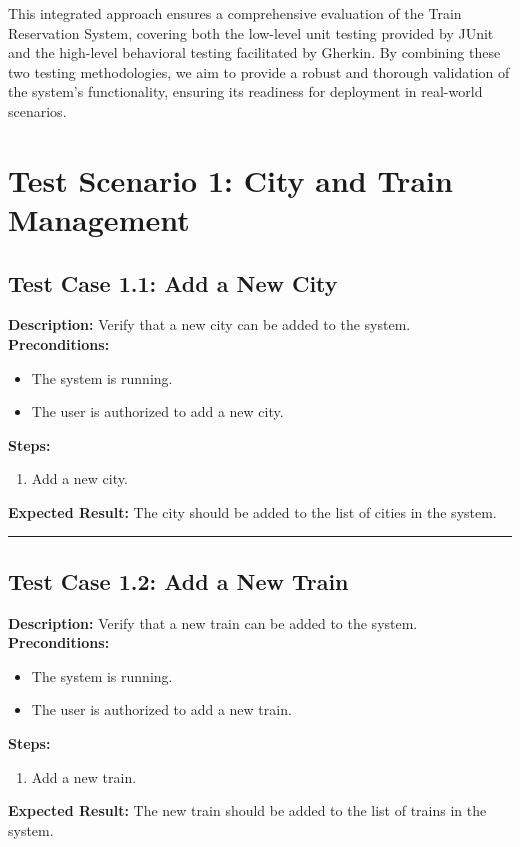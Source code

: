 \documentclass{article}
\begin{document}
This integrated approach ensures a comprehensive evaluation of the Train Reservation System, covering both the low-level unit testing provided by JUnit and the high-level behavioral testing facilitated by Gherkin. By combining these two testing methodologies, we aim to provide a robust and thorough validation of the system's functionality, ensuring its readiness for deployment in real-world scenarios.

\pagebreak

\section{Test Scenario 1: City and Train Management}
\bigskip
\bigskip
\subsection{Test Case 1.1: Add a New City}

\textbf{Description:} Verify that a new city can be added to the system.\\
\textbf{Preconditions:}
\begin{itemize}
  \item The system is running.
  \item The user is authorized to add a new city.
\end{itemize}
\textbf{Steps:}
\begin{enumerate}
  \item Add a new city.
\end{enumerate}
\textbf{Expected Result:} The city should be added to the list of cities in the system.

\bigskip
\hrule
\bigskip


\subsection{Test Case 1.2: Add a New Train}

\textbf{Description:} Verify that a new train can be added to the system.\\
\textbf{Preconditions:}
\begin{itemize}
  \item The system is running.
  \item The user is authorized to add a new train.
\end{itemize}
\textbf{Steps:}
\begin{enumerate}
  \item Add a new train.
\end{enumerate}
\textbf{Expected Result:} The new train should be added to the list of trains in the system.
\end{document}

